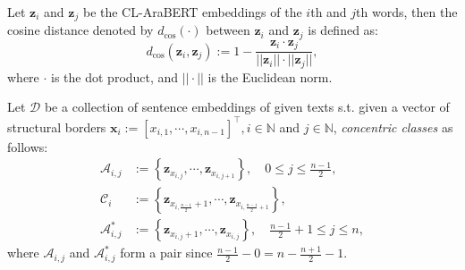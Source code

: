 \begin{defn}\label{defn:cosine_distance}
    Let $\mathbf{z}_i$ and $\mathbf{z}_j$ be the CL-AraBERT embeddings of the $i$th and $j$th words, then the cosine distance denoted by $d_{\cos}(\cdot)$ between $\mathbf{z}_i$ and $\mathbf{z}_j$ is defined as:
    \begin{equation}
        d_{\cos}(\mathbf{z}_i,\mathbf{z}_j):=1-\frac{\mathbf{z}_i\cdot\mathbf{z}_j}{||\mathbf{z}_i||\cdot||\mathbf{z}_j||},
    \end{equation}
    where $\cdot$ is the dot product, and $||\cdot||$ is the Euclidean norm.
\end{defn}
\begin{defn}\label{defn:concentric_classes}
    Let $\mathscr{D}$ be a collection of sentence embeddings of given texts s.t. given a vector of structural borders $\mathbf{x}_i:=[x_{i,1},\cdots,x_{i,n-1}]^{\top},i\in\mathbb{N}$ and $j\in\mathbb{N}$, \exists\; \textit{concentric classes} as follows:
    \begin{align}
        \mathscr{A}_{i,j}&:=\left\{\mathbf{z}_{x_{i,j}},\cdots,\mathbf{z}_{x_{i,j+1}}\right\},\quad 0\leq j\leq \frac{n-1}{2},\\
        \mathscr{C}_{i}&:=\left\{\mathbf{z}_{x_{i,\frac{n-1}{2}}+1},\cdots,\mathbf{z}_{x_{i,\frac{n-1}{2}+1}}\right\},\\
        \mathscr{A}_{i,j}^{*}&:=\left\{\mathbf{z}_{x_{i,j}+1},\cdots,\mathbf{z}_{x_{i,j}}\right\},\quad \frac{n-1}{2}+1\leq j\leq n,
    \end{align}
    where $\mathscr{A}_{i,j}$ and $\mathscr{A}_{i,j}^{*}$ form a pair since $\frac{n-1}{2}-0=n-\frac{n+1}{2}-1$.
\end{defn}
